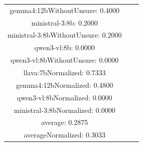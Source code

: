 \documentclass[a4paper]{article}
\begin{document}
\begin{tabular}{ccc}
gemma4:12bWithoutUnsure: 0.4000 \\ ministral-3:8b: 0.2000 \\ ministral-3:8bWithoutUnsure: 0.2000 \\ qwen3-vl:8b: 0.0000 \\ qwen3-vl:8bWithoutUnsure: 0.0000 \\ llava:7bNormalized: 0.7333 \\ gemma4:12bNormalized: 0.4800 \\ qwen3-vl:8bNormalized: 0.0000 \\ ministral-3:8bNormalized: 0.0000 \\ average: 0.2875 \\ averageNormalized: 0.3033 \end{minipage}\\
\end{tabular}

\vspace{5mm}
\end{document}
